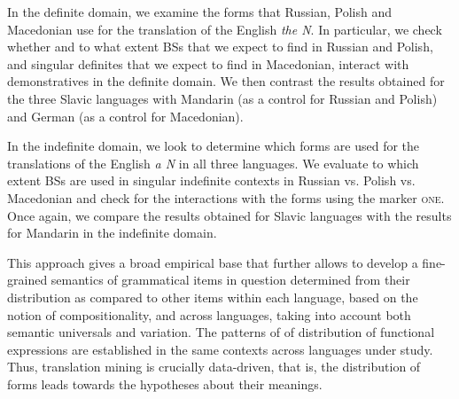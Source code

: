 \documentclass[output=paper,colorlinks,citecolor=brown]{langscibook}
\begin{document}
\noindent In the definite domain, we examine the forms that Russian, Polish and Macedonian use for the translation of the English \textit{the N}. In particular, we check whether and to what extent BSs that we expect to find in Russian and Polish, and singular definites that we expect to find in Macedonian, interact with demonstratives in the definite domain. We then contrast the results obtained for the three Slavic languages with Mandarin (as a control for Russian and Polish) and German (as a control for Macedonian).  

In the indefinite domain, we look to determine which forms are used for the translations of the English \textit{a N} in all three languages. We evaluate to which extent BSs are used in singular indefinite contexts in Russian vs. Polish vs. Macedonian and check for the interactions with the forms using the marker \textsc{one}. Once again, we compare the results obtained for Slavic languages with the results for Mandarin in the indefinite domain.



\iffalse
This approach gives a broad empirical base that further allows to develop a fine-grained semantics of grammatical items in question determined from their distribution as compared to other items within each language, based on the notion of compositionality, and across languages, taking into account both semantic universals and variation. The patterns of of distribution of functional expressions are established in the same contexts across languages under study.  Thus, translation mining is crucially data-driven, that is, the distribution of forms leads towards the hypotheses about their meanings.
\end{document}
